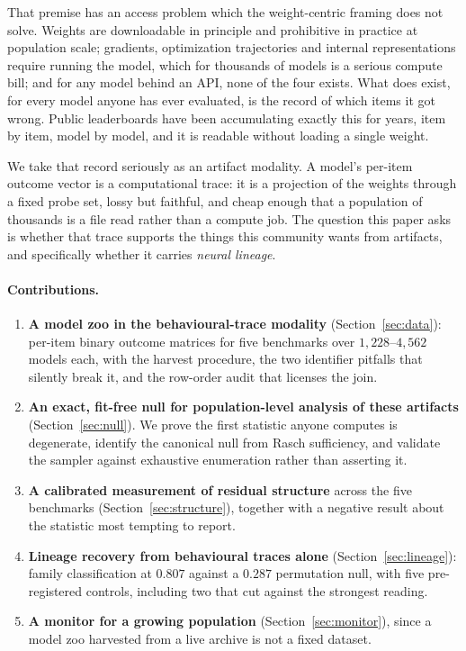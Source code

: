 \documentclass{article}
\begin{document}
That premise has an access problem which the weight-centric framing does not solve. Weights are
downloadable in principle and prohibitive in practice at population scale; gradients, optimization
trajectories and internal representations require running the model, which for thousands of models
is a serious compute bill; and for any model behind an API, none of the four exists. What does
exist, for every model anyone has ever evaluated, is the record of which items it got wrong. Public
leaderboards have been accumulating exactly this for years, item by item, model by model, and it is
readable without loading a single weight.

We take that record seriously as an artifact modality. A model's per-item outcome vector is a
computational trace: it is a projection of the weights through a fixed probe set, lossy but
faithful, and cheap enough that a population of thousands is a file read rather than a compute job.
The question this paper asks is whether that trace supports the things this community wants from
artifacts, and specifically whether it carries \emph{neural lineage}.

\paragraph{Contributions.}
\begin{enumerate}
\item \textbf{A model zoo in the behavioural-trace modality} (Section~\ref{sec:data}):
per-item binary outcome matrices for five benchmarks over $1{,}228$--$4{,}562$ models each, with
the harvest procedure, the two identifier pitfalls that silently break it, and the row-order audit
that licenses the join.
\item \textbf{An exact, fit-free null for population-level analysis of these artifacts}
(Section~\ref{sec:null}). We prove the first statistic anyone computes is degenerate, identify the
canonical null from Rasch sufficiency, and validate the sampler against exhaustive enumeration
rather than asserting it.
\item \textbf{A calibrated measurement of residual structure} across the five benchmarks
(Section~\ref{sec:structure}), together with a negative result about the statistic most tempting to
report.
\item \textbf{Lineage recovery from behavioural traces alone} (Section~\ref{sec:lineage}):
family classification at $0.807$ against a $0.287$ permutation null, with five pre-registered
controls, including two that cut against the strongest reading.
\item \textbf{A monitor for a growing population} (Section~\ref{sec:monitor}), since a model zoo
harvested from a live archive is not a fixed dataset.
\end{enumerate}
\end{document}
